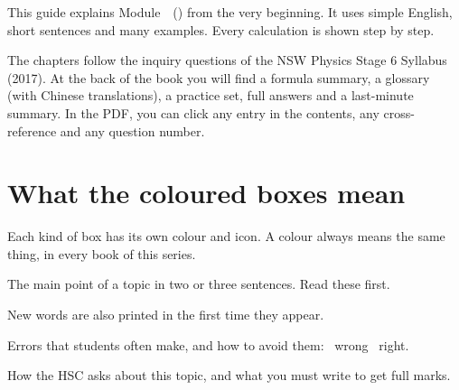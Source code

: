 
This guide explains Module~\modulenumber\ (\moduletitle) from the very beginning.
It uses simple English, short sentences and many examples. Every calculation is
shown step by step.

The chapters follow the inquiry questions of the NSW Physics Stage 6 Syllabus
(2017). At the back of the book you will find a formula summary, a glossary
(with Chinese translations), a practice set, full answers and a last-minute
summary. In the PDF, you can click any entry in the contents, any
cross-reference and any question number.

\section*{What the coloured boxes mean}

Each kind of box has its own colour and icon. A colour always means the same
thing, in every book of this series.

\begin{sidebyside}[0.5]
  \begin{bigidea}[before skip=0pt, after skip=0pt, equal height group=legend1, fontupper=\normalsize]
    The main point of a topic in two or three sentences. Read these first.
  \end{bigidea}
\nextside
  \begin{keywords}[before skip=0pt, after skip=0pt, equal height group=legend1]
    New words are also printed in  the first time they appear.
  \end{keywords}
\end{sidebyside}

\begin{sidebyside}[0.5]
  \begin{mistakes}[before skip=0pt, after skip=0pt, equal height group=legend2]
    Errors that students often make, and how to avoid them:
    \xmark\ wrong \enspace \cmark\ right.
  \end{mistakes}
\nextside
  \begin{examtip}[before skip=0pt, after skip=0pt, equal height group=legend2]
    How the HSC asks about this topic, and what you must write to get full
    marks.
  \end{examtip}
\end{sidebyside}

